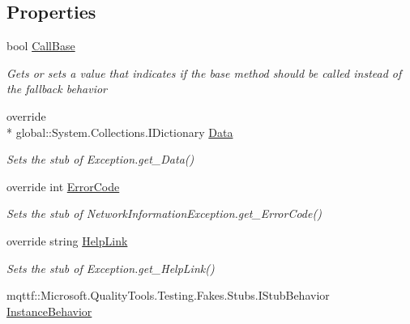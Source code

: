 \subsection*{Properties}
\begin{DoxyCompactItemize}
\item 
bool \hyperlink{class_system_1_1_net_1_1_network_information_1_1_fakes_1_1_stub_network_information_exception_a02b606ea8f341be2f466ae965358af66}{Call\-Base}
\begin{DoxyCompactList}\small\item\em Gets or sets a value that indicates if the base method should be called instead of the fallback behavior\end{DoxyCompactList}\item 
override \\*
global\-::\-System.\-Collections.\-I\-Dictionary \hyperlink{class_system_1_1_net_1_1_network_information_1_1_fakes_1_1_stub_network_information_exception_a0956efc2ac09093857d962371d777cb7}{Data}
\begin{DoxyCompactList}\small\item\em Sets the stub of Exception.\-get\-\_\-\-Data()\end{DoxyCompactList}\item 
override int \hyperlink{class_system_1_1_net_1_1_network_information_1_1_fakes_1_1_stub_network_information_exception_a073345123b9173a6ff4c1572490a53f5}{Error\-Code}
\begin{DoxyCompactList}\small\item\em Sets the stub of Network\-Information\-Exception.\-get\-\_\-\-Error\-Code()\end{DoxyCompactList}\item 
override string \hyperlink{class_system_1_1_net_1_1_network_information_1_1_fakes_1_1_stub_network_information_exception_afb197845d47a01c43680436556e5311c}{Help\-Link}
\begin{DoxyCompactList}\small\item\em Sets the stub of Exception.\-get\-\_\-\-Help\-Link()\end{DoxyCompactList}\item 
mqttf\-::\-Microsoft.\-Quality\-Tools.\-Testing.\-Fakes.\-Stubs.\-I\-Stub\-Behavior \hyperlink{class_system_1_1_net_1_1_network_information_1_1_fakes_1_1_stub_network_information_exception_adca05070e1ab2da490d0cc08a7fb7bc3}{Instance\-Behavior}

\end{DoxyCompactItemize}
